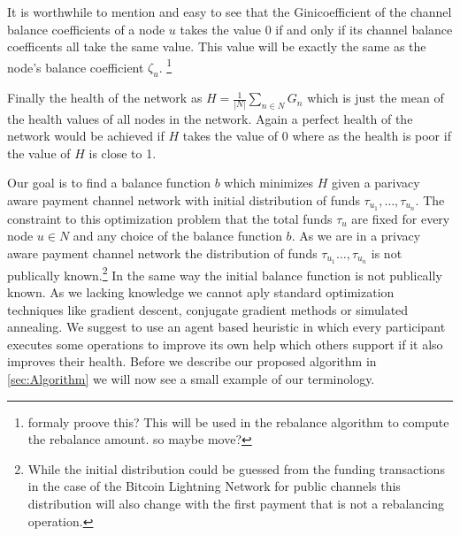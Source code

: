 \documentclass[a4paper]{paper}
\begin{document}
It is worthwhile to mention and easy to see that the Ginicoefficient of the channel balance coefficients of a node $u$ takes the value $0$ if and only if its channel balance coefficents all take the same value.
This value will be exactly the same as the node's balance coefficient $\zeta_u$. \footnote{formaly proove this? This will be used in the rebalance algorithm to compute the rebalance amount. so maybe move? }

Finally the health of the network as $H = \displaystyle{\frac{1}{|N|}\sum_{n\in N}G_n}$ which is just the mean of the health values of all nodes in the network.
Again a perfect health of the network would be achieved if $H$ takes the value of $0$ where as the health is poor if the value of $H$ is close to 1.

Our goal is to find a balance function $b$ which minimizes $H$ given a parivacy aware payment channel network with initial distribution of funds $\tau_{u_1},\dots,\tau_{u_n}$.
The constraint to this optimization problem that the total funds $\tau_u$ are fixed for every node $u \in N$ and any choice of the balance function $b$.
As we are in a privacy aware payment channel network the distribution of funds $\tau_{u_1}\dots,\tau_{u_n}$ is not publically known.\footnote{While the initial distribution could be guessed from the funding transactions in the case of the Bitcoin Lightning Network for public channels this distribution will also change with the first payment that is not a rebalancing operation.}
In the same way the initial balance function is not publically known.
As we lacking knowledge we cannot aply standard optimization techniques like gradient descent, conjugate gradient methods or simulated annealing.
We suggest to use an agent based heuristic in which every participant executes some operations to improve its own help which others support if it also improves their health.
Before we describe our proposed algorithm in \ref{sec:Algorithm} we will now see a small example of our terminology. 
\end{document}
